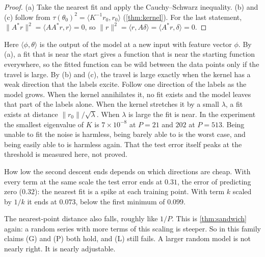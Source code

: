 \begin{proof}
(a) Take the nearest fit and apply the Cauchy--Schwarz inequality.
(b) and (c) follow from $\tau(\theta_0)^2=\langle K^{-1}r_0,r_0\rangle$
(\cref{thm:kernel}). For the last statement, $\|A^*r\|^2=\langle AA^*r,r\rangle=0$,
so $\|r\|^2=\langle r,A\delta\rangle=\langle A^*r,\delta\rangle=0$.
\end{proof}

Here $\langle\phi,\theta\rangle$ is the output of the model at a new input
with feature vector $\phi$. By (a), a fit that is near the start gives a
function that is near the starting function everywhere, so the fitted function
can be wild between the data points only if the travel is large. By (b) and
(c), the travel is large exactly when the kernel has a weak direction that
the labels excite. Follow one direction of the labels as the model grows. When
the kernel annihilates it, no fit exists and the model leaves that part of the
labels alone. When the kernel stretches it by a small $\lambda$, a fit exists
at distance $\|r_0\|/\sqrt\lambda$. When $\lambda$ is large the fit is near.
In the experiment the smallest eigenvalue of $K$ is $7\times10^{-8}$ at $P=21$
and $202$ at $P=513$. Being unable to fit the noise is harmless, being barely
able to is the worst case, and being easily able to is harmless again. That the
test error itself peaks at the threshold is measured here, not proved.

How low the second descent ends depends on which directions are cheap. With
every term at the same scale the test error ends at $0.31$, the error of
predicting zero ($0.32$): the nearest fit is a spike at each training point.
With term $k$ scaled by $1/k$ it ends at $0.073$, below the first minimum of
$0.099$.

The nearest-point distance also falls, roughly like $1/P$. This is
\cref{thm:sandwich} again: a random series with more terms of this scaling is
steeper. So in this family claims (G) and (P) both hold, and (L) still fails.
A larger random model is not nearly right. It is nearly adjustable.
